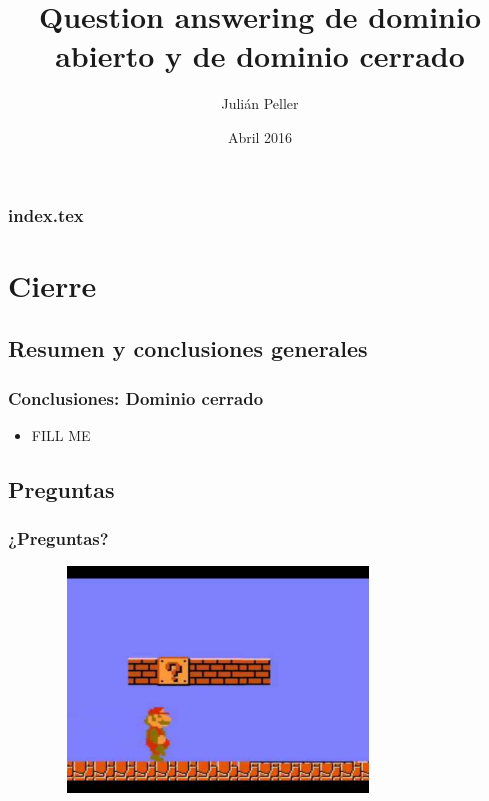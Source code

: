 \documentclass{beamer}
\title{Question answering de dominio abierto y de dominio cerrado}
\author{Julián Peller}
\date{Abril 2016} %
\begin{document}
\begin{frame}
  \titlepage
\end{frame}

\begin{frame}
  \frametitle{index.tex}
  \tableofcontents[pausesections]
\end{frame}






\section{Cierre}
  \subsection*{Resumen y conclusiones generales}
    \begin{frame}
    \frametitle{Conclusiones: Dominio cerrado}
      \begin{itemize}
        \item {\color{red} FILL ME}
      \end{itemize}
    \end{frame}


  \subsection*{Preguntas}
  \begin{frame}
    \frametitle{¿Preguntas?}
      \begin{figure}
        \includegraphics[width=9cm,height=6cm]{graficos/qmark2.pdf}
      \end{figure}
    \end{frame}


\end{document}
